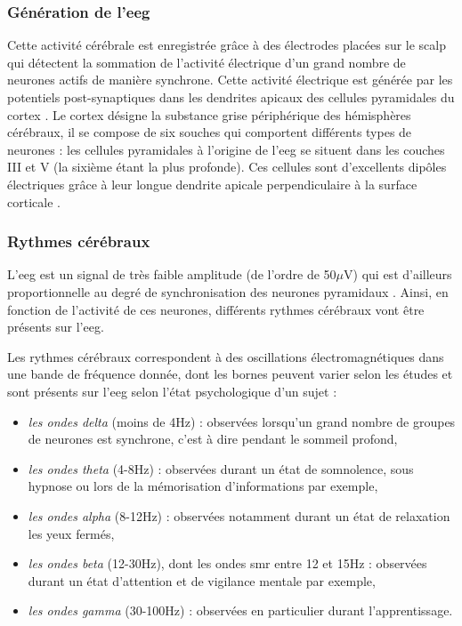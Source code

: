 \subsubsection{Génération de l'\gls{eeg}}

Cette activité cérébrale est enregistrée grâce à des électrodes placées sur le scalp qui détectent la sommation de l'activité électrique d'un grand nombre de neurones actifs de manière synchrone.
Cette activité électrique est générée par les potentiels post-synaptiques dans les dendrites apicaux des cellules pyramidales du cortex \citep{Hallez2007}. Le cortex désigne 
la substance grise périphérique des hémisphères cérébraux, il se compose de six souches qui comportent différents types de neurones : les cellules pyramidales à l'origine de l'\gls{eeg} 
se situent dans les couches III et V (la sixième étant la plus profonde). Ces cellules sont d'excellents dipôles électriques grâce à leur longue dendrite apicale perpendiculaire 
à la surface corticale \citep{Bekkers2011}. 

\subsubsection{Rythmes cérébraux}

L'\gls{eeg} est un signal de très faible amplitude (de l'ordre de 50$\mu$V) qui est d'ailleurs proportionnelle au degré de synchronisation des neurones pyramidaux \citep{Hallez2007}. 
Ainsi, en fonction de l'activité de ces neurones, différents rythmes cérébraux vont être présents sur l'\gls{eeg}. 

Les rythmes cérébraux correspondent à des oscillations électromagnétiques dans une bande de fréquence donnée, dont les bornes peuvent varier selon les études et sont présents sur l'\gls{eeg}
selon l'état psychologique d'un sujet \citep{Marzbani2016} :  
\renewcommand{\labelitemi}{$\bullet$}
\renewcommand{\labelitemii}{$\cdot$}
\begin{itemize}
\item \emph{les ondes delta} (moins de 4Hz) : observées lorsqu'un grand nombre de groupes de neurones est synchrone, c'est à dire pendant le sommeil profond,
\item \emph{les ondes theta} (4-8Hz) : observées durant un état de somnolence, sous hypnose ou lors de la mémorisation d'informations par exemple,
\item \emph{les ondes alpha} (8-12Hz) : observées notamment durant un état de relaxation les yeux fermés,
\item \emph{les ondes beta} (12-30Hz), dont les ondes \gls{smr} entre 12 et 15Hz : observées durant un état d'attention et de vigilance mentale par exemple,
\item \emph{les ondes gamma} (30-100Hz) : observées en particulier durant l'apprentissage.
\end{itemize}

